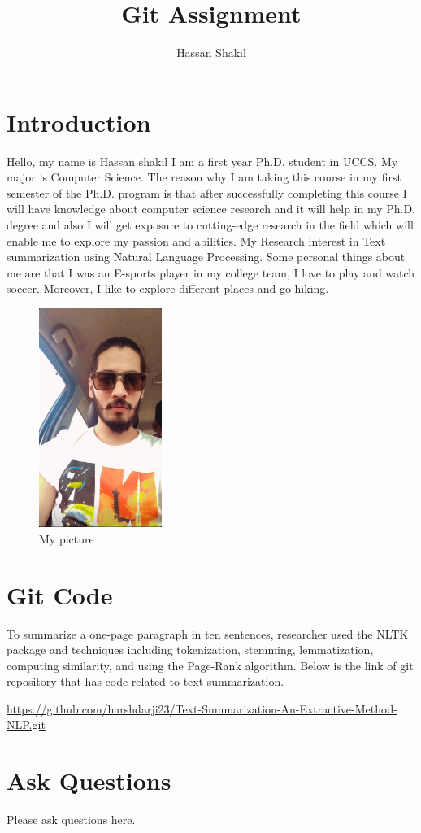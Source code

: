 \documentclass{article}
\title{Git Assignment}
\author{Hassan Shakil}
\begin{document}
\maketitle


\section{Introduction}

Hello, my name is Hassan shakil I am a first year Ph.D. student in UCCS. My major is Computer Science. The reason why I am taking this course in my first semester of the Ph.D. program is that after successfully completing this course I will have knowledge about computer science research and it will help in my Ph.D. degree and also I will get exposure to cutting-edge research in the field which will enable me to explore my passion and abilities. My Research interest in Text summarization using Natural Language Processing. Some personal things about me are that I was an E-sports player in my college team, I love to play and watch soccer. Moreover, I like to explore different places and go hiking.

\begin{figure}[htp]
    \centering
    \includegraphics[width=4cm]{Myimg.jpeg}
    \caption{My picture}
    \label{fig:Myimg}
\end{figure}

\section{Git Code}
To summarize a one-page paragraph in ten sentences, researcher used the NLTK package and techniques including tokenization, stemming, lemmatization, computing similarity, and using the Page-Rank algorithm. Below is the link of git repository that has code related to text summarization.

\url{https://github.com/harshdarji23/Text-Summarization-An-Extractive-Method-NLP.git}

\section{Ask Questions}
Please ask questions here.
\end{document}
